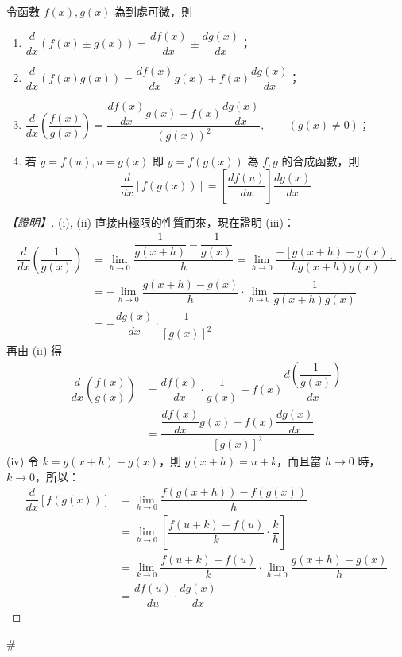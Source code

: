 \begin{theorem}[微分運算的基本法則]\label{thm:b6s-app4-diff-rules}
令函數 $f(x), g(x)$ 為到處可微，則
\begin{enumerate}[label=(\roman*), leftmargin=2em]
  \item $\dfrac{d}{dx}(f(x)\pm g(x)) = \dfrac{df(x)}{dx} \pm \dfrac{dg(x)}{dx}$；
  \item $\dfrac{d}{dx}(f(x)g(x)) = \dfrac{df(x)}{dx}g(x) + f(x)\dfrac{dg(x)}{dx}$；
  \item $\dfrac{d}{dx}\left(\dfrac{f(x)}{g(x)}\right) = \dfrac{\dfrac{df(x)}{dx}g(x) - f(x)\dfrac{dg(x)}{dx}}{(g(x))^2}, \qquad (g(x)\ne 0)$；
  \item 若 $y=f(u), u=g(x)$ 即 $y=f(g(x))$ 為 $f, g$ 的合成函數，則
  \[ \dfrac{d}{dx}[f(g(x))] = \left[\dfrac{df(u)}{du}\right]\dfrac{dg(x)}{dx} \]
\end{enumerate}
\end{theorem}

\begin{proof}[【證明】]
(i), (ii) 直接由極限的性質而來，現在證明 (iii)：
\begin{align*}
\dfrac{d}{dx}\left(\dfrac{1}{g(x)}\right) &= \lim_{h\to 0}\dfrac{\dfrac{1}{g(x+h)} - \dfrac{1}{g(x)}}{h} = \lim_{h\to 0}\dfrac{-[g(x+h)-g(x)]}{h g(x+h)g(x)} \\
&= -\lim_{h\to 0}\dfrac{g(x+h)-g(x)}{h}\cdot\lim_{h\to 0}\dfrac{1}{g(x+h)g(x)} \\
&= -\dfrac{dg(x)}{dx}\cdot\dfrac{1}{[g(x)]^2}
\end{align*}
再由 (ii) 得
\begin{align*}
\dfrac{d}{dx}\left(\dfrac{f(x)}{g(x)}\right) &= \dfrac{df(x)}{dx}\cdot\dfrac{1}{g(x)} + f(x)\dfrac{d\left(\dfrac{1}{g(x)}\right)}{dx} \\
&= \dfrac{\dfrac{df(x)}{dx}g(x) - f(x)\dfrac{dg(x)}{dx}}{[g(x)]^2}
\end{align*}
(iv) 令 $k=g(x+h)-g(x)$，則 $g(x+h)=u+k$，而且當 $h\longrightarrow 0$ 時，$k\longrightarrow 0$，所以：
\begin{align*}
\dfrac{d}{dx}[f(g(x))] &= \lim_{h\to 0}\dfrac{f(g(x+h))-f(g(x))}{h} \\
&= \lim_{h\to 0}\left[\dfrac{f(u+k)-f(u)}{k}\cdot\dfrac{k}{h}\right] \\
&= \lim_{k\to 0}\dfrac{f(u+k)-f(u)}{k}\cdot\lim_{h\to 0}\dfrac{g(x+h)-g(x)}{h} \\
&= \dfrac{df(u)}{du}\cdot\dfrac{dg(x)}{dx}
\end{align*}
\end{proof}\hfill$\#$


